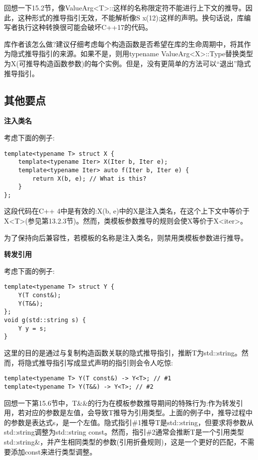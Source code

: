 回想一下15.2节，像ValueArg<T>::这样的名称限定符不能进行上下文的推导。因此，这种形式的推导指引无效，不能解析像S x(12);这样的声明。换句话说，库编写者执行这种转换很可能会破坏C++17的代码。

库作者该怎么做?建议仔细考虑每个构造函数是否希望在库的生命周期中，将其作为隐式推导指引的来源。如果不是，则用typename ValueArg<X>::Type替换类型为X(可推导构造函数参数)的每个实例。但是，没有更简单的方法可以“退出”隐式推导指引。

\subsection{其他要点}

\noindent
\textbf{注入类名}

考虑下面的例子:

\begin{lstlisting}[style=styleCXX]
template<typename T> struct X {
	template<typename Iter> X(Iter b, Iter e);
	template<typename Iter> auto f(Iter b, Iter e) {
		return X(b, e); // What is this?
	}
};
\end{lstlisting}

这段代码在C++ 4中是有效的:X(b, e)中的X是注入类名，在这个上下文中等价于X<T>(参见第13.2.3节)。然而，类模板参数推导的规则会使X等价于X<iter>。

为了保持向后兼容性，若模板的名称是注入类名，则禁用类模板参数进行推导。


\noindent
\textbf{转发引用}

考虑下面的例子:

\begin{lstlisting}[style=styleCXX]
template<typename T> struct Y {
	Y(T const&);
	Y(T&&);
};
void g(std::string s) {
	Y y = s;
}
\end{lstlisting}

这里的目的是通过与复制构造函数关联的隐式推导指引，推断T为std::string。然而，将隐式推导指引写成显式声明的指引则会令人吃惊:

\begin{lstlisting}[style=styleCXX]
template<typename T> Y(T const&) -> Y<T>; // #1
template<typename T> Y(T&&) -> Y<T>; // #2
\end{lstlisting}

回想一下第15.6节中，T\&\&的行为在模板参数推导期间的特殊行为:作为转发引用，若对应的参数是左值，会导致T推导为引用类型。上面的例子中，推导过程中的参数是表达式s，是一个左值。隐式指引\#1推导T是std::string，但要求将参数从std::string调整为std::string const。然而，指引\#2通常会推断T是一个引用类型std::string\&，并产生相同类型的参数(引用折叠规则)，这是一个更好的匹配，不需要添加const来进行类型调整。


